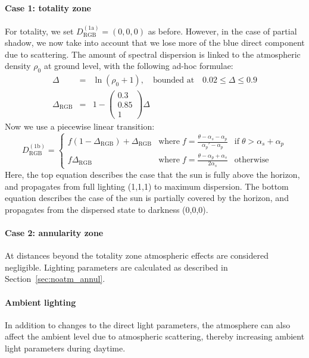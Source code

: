 \documentclass[Orbiter Technical Reference.tex]{subfiles}
\begin{document}
\paragraph{Case 1: totality zone}
For totality, we set $D_\text{RGB}^{(\text{1a})} = (0,0,0)$ as before.
However, in the case of partial shadow, we now take into account that we lose more of the blue direct component due to scattering. The amount of spectral dispersion is linked to the atmospheric density $\rho_0$ at ground level, with the following ad-hoc formulae:
\begin{eqnarray}
\Delta &=& \ln (\rho_0+1),\quad\text{bounded at}\quad 0.02 \leq \Delta \leq 0.9\\
\Delta_\text{RGB} &=& 1-\left(
\begin{array}{c} 0.3 \\ 0.85 \\ 1 \end{array}
\right) \Delta
\end{eqnarray}
Now we use a piecewise linear transition:
\begin{equation}
D_\text{RGB}^{(\text{1b})} = \left\lbrace
\begin{array}{cll}
f (1-\Delta_\text{RGB}) + \Delta_\text{RGB} &\text{where}\; f = \frac{\theta-\alpha_s-\alpha_p}{\alpha_p'-\alpha_p} &\text{if}\; \theta > \alpha_s+\alpha_p \\
f \Delta_\text{RGB} & \text{where}\;f = \frac{\theta-\alpha_p+\alpha_s}{2\alpha_s} &\text{otherwise}
\end{array}
\right.
\end{equation}
Here, the top equation describes the case that the sun is fully above the horizon, and propagates from full lighting (1,1,1) to maximum dispersion. The bottom equation describes the case of the sun is partially covered by the horizon, and propagates from the dispersed state to darkness (0,0,0).

\paragraph{Case 2: annularity zone}
At distances beyond the totality zone atmospheric effects are considered negligible. Lighting parameters are calculated as described in Section~\ref{sec:noatm_annul}.

\paragraph{Ambient lighting}
In addition to changes to the direct light parameters, the atmosphere can also affect the ambient level due to atmospheric scattering, thereby increasing ambient light parameters during daytime.
\end{document}
